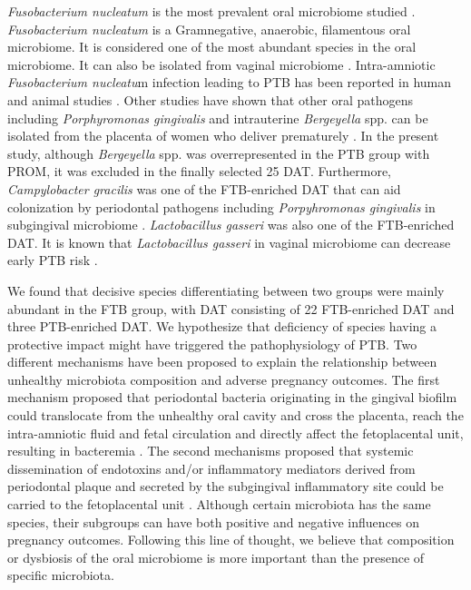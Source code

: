 \documentclass[11pt, a4paper, onecolumn, oneside]{report}
\begin{document}
            \textit{Fusobacterium nucleatum} is the most prevalent oral microbiome studied \cite{Fusobacterium-1, Fusobacterium-2, Fusobacterium-3}. \textit{Fusobacterium nucleatum} is a Gramnegative, anaerobic, filamentous oral microbiome. It is considered one of the most abundant species in the oral microbiome. It can also be isolated from vaginal microbiome \cite{PTB-mechanism-7, PTB-mechanism-8}. Intra-amniotic \textit{Fusobacterium nucleatu}m infection leading to PTB has been reported in human and animal studies \cite{Fusobacterium-4}. Other studies have shown that other oral pathogens including \textit{Porphyromonas gingivalis} and intrauterine \textit{Bergeyella} spp. can be isolated from the placenta of women who deliver prematurely \cite{Porphyromonas-1, Porphyromonas-2}. In the present study, although \textit{Bergeyella} spp. was overrepresented in the PTB group with PROM, it was excluded in the finally selected 25 DAT. Furthermore, \textit{Campylobacter gracilis} was one of the FTB-enriched DAT that can aid colonization by periodontal pathogens including \textit{Porpyhromonas gingivalis} in subgingival microbiome \cite{PTB-mechanism-9}. \textit{Lactobacillus gasseri }was also one of the FTB-enriched DAT. It is known that \textit{Lactobacillus gasseri} in vaginal microbiome can decrease early PTB risk \cite{PTB-mechanism-10, PTB-mechanism-11}.

            We found that decisive species differentiating between two groups were mainly abundant in the FTB group, with DAT consisting of 22 FTB-enriched DAT and three PTB-enriched DAT. We hypothesize that deficiency of species having a protective impact might have triggered the pathophysiology of PTB. Two different mechanisms have been proposed to explain the relationship between unhealthy microbiota composition and adverse pregnancy outcomes. The first mechanism proposed that periodontal bacteria originating in the gingival biofilm could translocate from the unhealthy oral cavity and cross the placenta, reach the intra-amniotic fluid and fetal circulation and directly affect the fetoplacental unit, resulting in bacteremia \cite{Periodontitis-1}. The second mechanisms proposed that systemic dissemination of endotoxins and/or inflammatory mediators derived from periodontal plaque and  secreted by the subgingival inflammatory site could be carried to the fetoplacental unit \cite{PTB-mechanism-12, PTB-mechanism-13}. Although certain microbiota has the same species, their subgroups can have both positive and negative influences on pregnancy outcomes. Following this line of thought, we believe that composition or dysbiosis of the oral microbiome is more important than the presence of specific microbiota.
\end{document}
